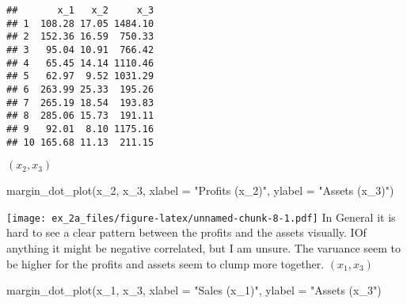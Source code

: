 \documentclass[
]{article}
\newenvironment{Shaded}{\begin{snugshade}}{\end{snugshade}}
\newcommand{\AttributeTok}[1]{\textcolor[rgb]{0.77,0.63,0.00}{#1}}
\newcommand{\FunctionTok}[1]{\textcolor[rgb]{0.00,0.00,0.00}{#1}}
\newcommand{\NormalTok}[1]{#1}
\newcommand{\OtherTok}[1]{\textcolor[rgb]{0.56,0.35,0.01}{#1}}
\newcommand{\SpecialCharTok}[1]{\textcolor[rgb]{0.00,0.00,0.00}{#1}}
\newcommand{\StringTok}[1]{\textcolor[rgb]{0.31,0.60,0.02}{#1}}
\begin{document}
\begin{Shaded}
\end{Shaded}

\begin{verbatim}
##       x_1   x_2     x_3
## 1  108.28 17.05 1484.10
## 2  152.36 16.59  750.33
## 3   95.04 10.91  766.42
## 4   65.45 14.14 1110.46
## 5   62.97  9.52 1031.29
## 6  263.99 25.33  195.26
## 7  265.19 18.54  193.83
## 8  285.06 15.73  191.11
## 9   92.01  8.10 1175.16
## 10 165.68 11.13  211.15
\end{verbatim}

\((x_2, x_3)\)

\begin{Shaded}
\begin{Highlighting}[]
\FunctionTok{margin\_dot\_plot}\NormalTok{(x\_2, x\_3, }\AttributeTok{xlabel =} \StringTok{"Profits (x\_2)"}\NormalTok{, }\AttributeTok{ylabel =} \StringTok{"Assets (x\_3)"}\NormalTok{)}
\end{Highlighting}
\end{Shaded}

\texttt{[image: ex\_2a\_files/figure-latex/unnamed-chunk-8-1.pdf]} In
General it is hard to see a clear pattern between the profits and the
assets visually. IOf anything it might be negative correlated, but I am
unsure. The varuance seem to be higher for the profits and assets seem
to clump more together. \((x_1, x_3)\)

\begin{Shaded}
\begin{Highlighting}[]
\FunctionTok{margin\_dot\_plot}\NormalTok{(x\_1, x\_3, }\AttributeTok{xlabel =} \StringTok{"Sales (x\_1)"}\NormalTok{, }\AttributeTok{ylabel =} \StringTok{"Assets (x\_3"}\NormalTok{)}
\end{Highlighting}
\end{Shaded}
\end{document}
